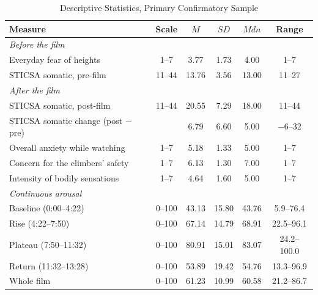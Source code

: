 \begin{table}[tbp]
\caption{Descriptive Statistics, Primary Confirmatory Sample}
\label{tab:descriptives}
\begin{threeparttable}
\linespread{1}\selectfont
\begin{tabular}{@{}lccccc@{}}
\toprule
Measure & Scale & $M$ & $SD$ & $Mdn$ & Range \\
\midrule
\multicolumn{6}{l}{\textit{Before the film}} \\
\hspace{1em}Everyday fear of heights & 1--7 & 3.77 & 1.73 & 4.00 & 1--7 \\
\hspace{1em}STICSA somatic, pre-film & 11--44 & 13.76 & 3.56 & 13.00 & 11--27 \\
\multicolumn{6}{l}{\textit{After the film}} \\
\hspace{1em}STICSA somatic, post-film & 11--44 & 20.55 & 7.29 & 18.00 & 11--44 \\
\hspace{1em}STICSA somatic change (post $-$ pre) &  & 6.79 & 6.60 & 5.00 & $-$6--32 \\
\hspace{1em}Overall anxiety while watching & 1--7 & 5.18 & 1.33 & 5.00 & 1--7 \\
\hspace{1em}Concern for the climbers' safety & 1--7 & 6.13 & 1.30 & 7.00 & 1--7 \\
\hspace{1em}Intensity of bodily sensations & 1--7 & 4.64 & 1.60 & 5.00 & 1--7 \\
\multicolumn{6}{l}{\textit{Continuous arousal}} \\
\hspace{1em}Baseline (0:00--4:22) & 0--100 & 43.13 & 15.80 & 43.76 & 5.9--76.4 \\
\hspace{1em}Rise (4:22--7:50) & 0--100 & 67.14 & 14.79 & 68.91 & 22.5--96.1 \\
\hspace{1em}Plateau (7:50--11:32) & 0--100 & 80.91 & 15.01 & 83.07 & 24.2--100.0 \\
\hspace{1em}Return (11:32--13:28) & 0--100 & 53.89 & 19.42 & 54.76 & 13.3--96.9 \\
\hspace{1em}Whole film & 0--100 & 61.23 & 10.99 & 60.58 & 21.2--86.7 \\

\end{tabular}
\end{threeparttable}
\end{table}
